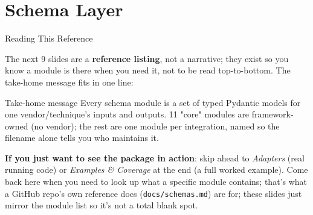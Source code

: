 \documentclass[
  ignorenonframetext,
  aspectratio=169,
]{beamer}
\begin{document}
\section{Schema Layer}\label{schema-layer}

\begin{frame}[fragile]{Reading This Reference}
\label{reading-this-reference}
\footnotesize

The next 9 slides are a \textbf{reference listing}, not a narrative;
they exist so you know a module is there when you need it, not to be
read top-to-bottom. The take-home message fits in one line: \normalsize

\begin{block}{Take-home message}
Every schema module is a set of typed Pydantic models for one vendor/technique's inputs and outputs. 11 "core" modules are framework-owned (no vendor); the rest are one module per integration, named so the filename alone tells you who maintains it.
\end{block}

\vspace{0.3em}
\footnotesize

\textbf{If you just want to see the package in action}: skip ahead to
\emph{Adapters} (real running code) or \emph{Examples \& Coverage} at
the end (a full worked example). Come back here when you need to look up
what a specific module contains; that's what a GitHub repo's own
reference docs (\texttt{docs/schemas.md}) are for; these slides just
mirror the module list so it's not a total blank spot. \normalsize
\end{frame}
\end{document}
